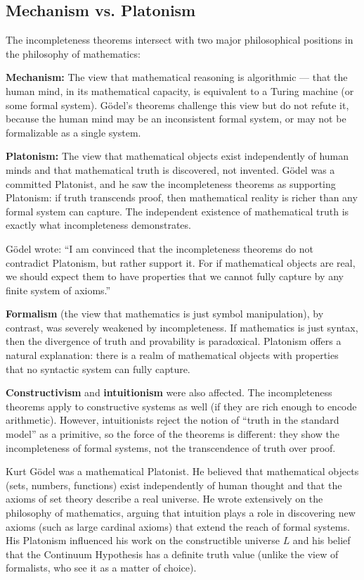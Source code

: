 \subsection*{Mechanism vs. Platonism}

The incompleteness theorems intersect with two major philosophical positions in the philosophy of mathematics:

\textbf{Mechanism:} The view that mathematical reasoning is algorithmic --- that the human mind, in its mathematical capacity, is equivalent to a Turing machine (or some formal system). Gödel's theorems challenge this view but do not refute it, because the human mind may be an inconsistent formal system, or may not be formalizable as a single system.

\textbf{Platonism:} The view that mathematical objects exist independently of human minds and that mathematical truth is discovered, not invented. Gödel was a committed Platonist, and he saw the incompleteness theorems as supporting Platonism: if truth transcends proof, then mathematical reality is richer than any formal system can capture. The independent existence of mathematical truth is exactly what incompleteness demonstrates.

Gödel wrote: ``I am convinced that the incompleteness theorems do not contradict Platonism, but rather support it. For if mathematical objects are real, we should expect them to have properties that we cannot fully capture by any finite system of axioms.''

\textbf{Formalism} (the view that mathematics is just symbol manipulation), by contrast, was severely weakened by incompleteness. If mathematics is just syntax, then the divergence of truth and provability is paradoxical. Platonism offers a natural explanation: there is a realm of mathematical objects with properties that no syntactic system can fully capture.

\textbf{Constructivism} and \textbf{intuitionism} were also affected. The incompleteness theorems apply to constructive systems as well (if they are rich enough to encode arithmetic). However, intuitionists reject the notion of ``truth in the standard model'' as a primitive, so the force of the theorems is different: they show the incompleteness of formal systems, not the transcendence of truth over proof.

Kurt Gödel was a mathematical Platonist. He believed that mathematical objects (sets, numbers, functions) exist independently of human thought and that the axioms of set theory describe a real universe. He wrote extensively on the philosophy of mathematics, arguing that intuition plays a role in discovering new axioms (such as large cardinal axioms) that extend the reach of formal systems. His Platonism influenced his work on the constructible universe $L$ and his belief that the Continuum Hypothesis has a definite truth value (unlike the view of formalists, who see it as a matter of choice).

